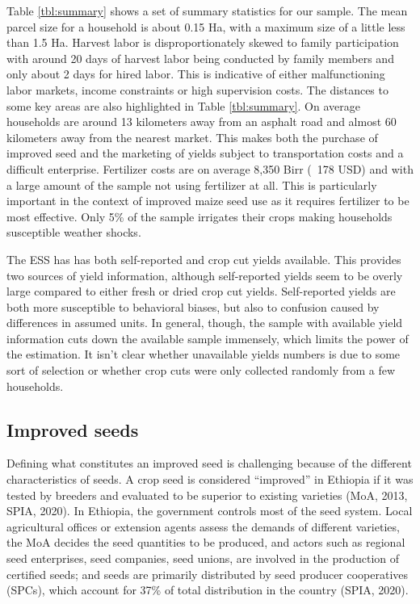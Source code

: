 \documentclass{article}
\begin{document}
Table \ref{tbl:summary} shows a set of summary statistics for our sample. The mean parcel size for a household is about 0.15 Ha, with a maximum size of a little less than 1.5 Ha. Harvest labor is disproportionately skewed to family participation with around 20 days of harvest labor being conducted by family members and only about 2 days for hired labor. This is indicative of either malfunctioning labor markets, income constraints or high supervision costs. The distances to some key areas are also highlighted in Table \ref{tbl:summary}. On average households are around 13 kilometers away from an asphalt road and almost 60 kilometers away from the nearest market. This makes both the purchase of improved seed and the marketing of yields subject to transportation costs and a difficult enterprise. Fertilizer costs are on average 8,350 Birr (~178 USD) and with a large amount of the sample not using fertilizer at all. This is particularly important in the context of improved maize seed use as it requires fertilizer to be most effective. Only 5\% of the sample irrigates their crops making households susceptible weather shocks.

{\small\tabcolsep=3pt  %
    
}

The ESS has has both self-reported and crop cut yields available. This provides two sources of yield information, although self-reported yields seem to be overly large compared to either fresh or dried crop cut yields. Self-reported yields are both more susceptible to behavioral biases, but also to confusion caused by differences in assumed units. In general, though, the sample with available yield information cuts down the available sample immensely, which limits the power of the estimation. It isn't clear whether unavailable yields numbers is due to some sort of selection or whether crop cuts were only collected randomly from a few households.

\subsection{Improved seeds}

Defining what constitutes an improved seed is challenging because of the different characteristics of seeds. A crop seed is considered “improved” in Ethiopia if it was tested by breeders and evaluated to be superior to existing varieties (MoA, 2013, SPIA, 2020). In Ethiopia, the government controls most of the seed system. Local agricultural offices or extension agents assess the demands of different varieties, the MoA decides the seed quantities to be produced, and actors such as regional seed enterprises, seed companies, seed unions, are involved in the production of certified seeds; and seeds are primarily distributed by seed producer cooperatives (SPCs), which account for 37\% of total distribution in the country (SPIA, 2020). 
\end{document}
